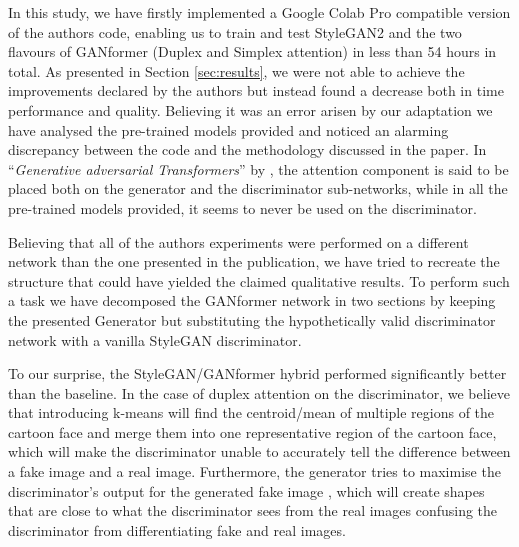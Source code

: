 \documentclass{article}
\begin{document}
	In this study, we have firstly implemented a Google Colab Pro compatible version of the authors 
	code, 
	enabling us to train and test StyleGAN2 and the two flavours of GANformer (Duplex and Simplex 
	attention) 
	in less than 54 hours in total.
	As presented in Section \ref{sec:results}, we were not able to achieve the improvements declared by 
	the authors but instead 
	found a decrease both in time performance and quality.
	Believing it was an error arisen by our adaptation we have analysed the pre-trained models provided 
	and 
	noticed an alarming discrepancy between the code and the methodology discussed in the paper.
	In ``\emph{Generative adversarial Transformers}'' by \citet{hudson2021generative}, the attention 
	component 
	is said to be placed both on the generator and the discriminator sub-networks, while in all the 
	pre-trained 
	models provided, it seems to never be used on the discriminator.
	
	
	Believing that all of the authors experiments were performed on a different network than the one 
	presented 
	in the publication, we have tried to recreate the structure that could have yielded the claimed 
	qualitative results.
	To perform such a task we have decomposed the GANformer network in two sections by keeping 
	the presented 
	Generator but substituting the hypothetically valid discriminator network with a vanilla StyleGAN 
	discriminator.
	
	To our surprise, the StyleGAN/GANformer hybrid performed significantly better than the baseline. In 
	the case of duplex attention on the discriminator, we believe that introducing k-means will find the 
	centroid/mean of multiple regions of the cartoon face and merge them into one representative region 
	of the cartoon face, which will make the discriminator unable to accurately tell the difference 
	between a fake image and a real image. Furthermore, the generator tries to maximise the 
	discriminator's output for the generated fake image \cite{gulrajani_improved_2017, 
		arjovsky_wasserstein_2017}, which will create shapes that are close to what the discriminator 
		sees 
	from the real images confusing the discriminator from differentiating fake and real images.
	
\end{document}
